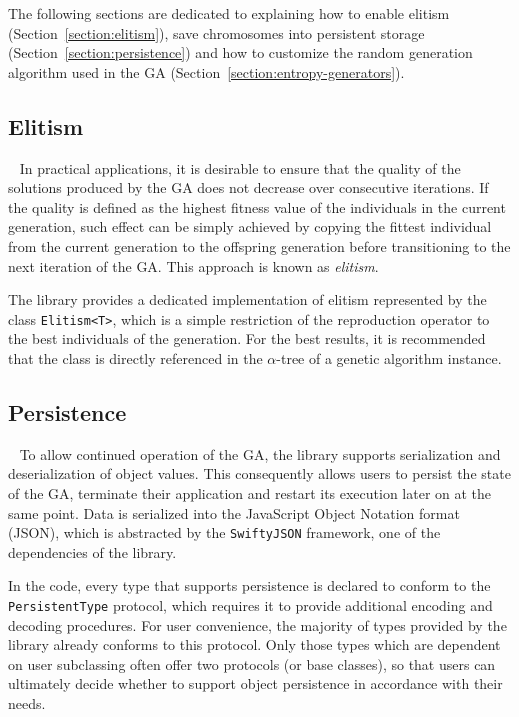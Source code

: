 The following sections are dedicated to explaining how to enable elitism (Section~\ref{section:elitism}), save chromosomes into persistent storage (Section~\ref{section:persistence}) and how to customize the random generation algorithm used in the GA (Section~\ref{section:entropy-generators}).

\subsection{Elitism}~\label{section:elitism}
In practical applications, it is desirable to ensure that the quality of the solutions produced by the GA does not decrease over consecutive iterations. If the quality is defined as the highest fitness value of the individuals in the current generation, such effect can be simply achieved by copying the fittest individual from the current generation to the offspring generation before transitioning to the next iteration of the GA. This approach is known as \textit{elitism}.

The library provides a dedicated implementation of elitism represented by the class \texttt{Elitism<T>}, which is a simple restriction of the reproduction operator to the best individuals of the generation. For the best results, it is recommended that the class is directly referenced in the $\alpha$-tree of a genetic algorithm instance.

\subsection{Persistence}~\label{section:persistence}
To allow continued operation of the GA, the library supports serialization and deserialization of object values. This consequently allows users to persist the state of the GA, terminate their application and restart its execution later on at the same point. Data is serialized into the JavaScript Object Notation format (JSON), which is abstracted by the \texttt{SwiftyJSON} framework, one of the dependencies of the library.

In the code, every type that supports persistence is declared to conform to the \texttt{PersistentType} protocol, which requires it to provide additional encoding and decoding procedures. For user convenience, the majority of types provided by the library already conforms to this protocol. Only those types which are dependent on user subclassing often offer two protocols (or base classes), so that users can ultimately decide whether to support object persistence in accordance with their needs.

